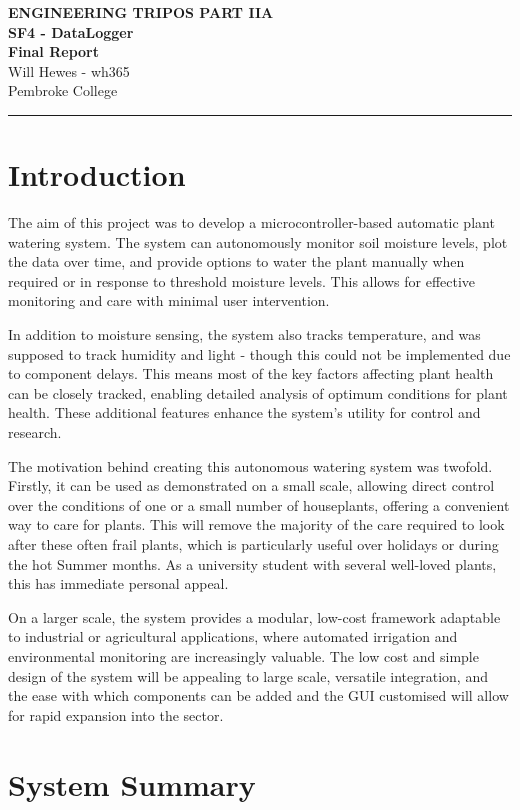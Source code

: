 \documentclass[a4paper,11pt]{article}
\renewcommand{\maketitle}{
    \begin{center}
        \LARGE \textbf{ENGINEERING TRIPOS PART IIA} \\[0.5em]
        \Large \textbf{SF4 - DataLogger} \\[0.5em]
        \textbf{Final Report} \\[1.5em]
        \vspace{-1em}
        \small Will Hewes - wh365 \\ 
        Pembroke College \\ 
        \vspace{0.5em}
    \end{center}
}
\begin{document}
% 
\maketitle
\hrule
\tableofcontents
\newpage
{} \setcounter{page}{1}

\section{Introduction}
\label{sec:introduction}

The aim of this project was to develop a microcontroller-based 
automatic plant watering system.
The system can autonomously monitor soil moisture levels, 
plot the data over time, and provide options to water the plant
manually when required or in response to threshold moisture levels.
This allows for effective monitoring and care with minimal user intervention.

In addition to moisture sensing, the system also tracks temperature, 
and was supposed to track humidity and light -
though this could not be implemented due to component delays.
This means most of the key factors affecting plant health
can be closely tracked, enabling detailed analysis of
optimum conditions for plant health.
These additional features enhance the system's utility
for control and research.

The motivation behind creating this autonomous watering system was twofold. 
Firstly, it can be used as demonstrated on a small scale,
allowing direct control over the conditions of one 
or a small number of houseplants,
offering a convenient way to care for plants.
This will remove the majority of the care required
to look after these often frail plants,
which is particularly useful over holidays or 
during the hot Summer months.
As a university student with several well-loved plants,
this has immediate personal appeal.

On a larger scale, the system provides a modular, 
low-cost framework adaptable to industrial or agricultural applications, 
where automated irrigation and environmental monitoring are increasingly valuable.
The low cost and simple design of the system will be appealing 
to large scale, versatile integration,
and the ease with which components can be added
and the GUI customised will allow for rapid expansion into the sector.

\section{System Summary}
\label{sec:summary}
\end{document}
